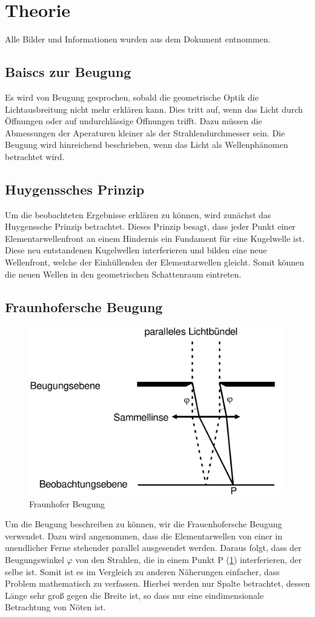 \section{Theorie}
\label{sec:Theorie}
Alle Bilder und Informationen wurden aus dem Dokument \cite{v406} entnommen.
\subsection{Baiscs zur Beugung}
Es wird von Beugung gesprochen, sobald die geometrische Optik die Lichtausbreitung nicht mehr erklären kann. 
Dies tritt auf, wenn das Licht durch Öffnungen oder auf undurchlässige Öffnungen trifft. 
Dazu müssen die Abmessungen der Aperaturen kleiner als der Strahlendurchmesser sein.
Die Beugung wird hinreichend beschrieben, wenn das Licht als Wellenphänomen betrachtet wird.
\subsection{Huygenssches Prinzip}
Um die beobachteten Ergebnisse erklären zu können, wird zunächst das Huygenssche Prinzip betrachtet.
Dieses Prinzip besagt, dass jeder Punkt einer Elementarwellenfront an einem Hindernis ein Fundament für eine Kugelwelle ist.
Diese neu entstandenen Kugelwellen interferieren und bilden eine neue Wellenfront, welche der Einhüllenden der Elementarwellen gleicht.
Somit können die neuen Wellen in den geometrischen Schattenraum eintreten.
\subsection{Fraunhofersche Beugung}
\begin{figure}
    \centering
    \caption{Fraunhofer Beugung}
    \label{fig:Fraunhofer}
    \includegraphics[width = 0.6 \textwidth]{pics/Frauenhofer.PNG}
\end{figure}
\noindent Um die Beugung beschreiben zu können, wir die Frauenhofersche Beugung verwendet.
Dazu wird angenommen, dass die Elementarwellen von einer in unendlicher Ferne stehender parallel ausgesendet werden.
Daraus folgt, dass der Beugungswinkel $\varphi $ von den Strahlen, die in einem Punkt P (\ref{fig:Fraunhofer}) interferieren,
der selbe ist. 
Somit ist es im Vergleich zu anderen Näherungen einfacher, dass Problem mathematisch zu verfassen.
Hierbei werden nur Spalte betrachtet, dessen Länge sehr groß gegen die Breite ist, so dass nur eine eindimensionale Betrachtung von Nöten ist.
